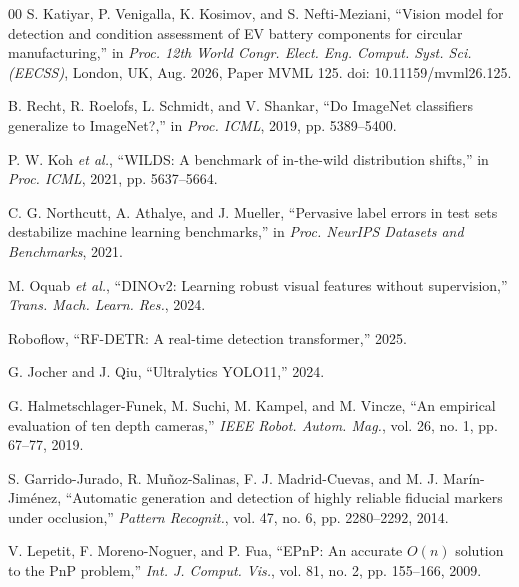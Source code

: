 \documentclass[conference]{IEEEtran}
\begin{document}
\begin{thebibliography}{00}
 S. Katiyar, P. Venigalla, K. Kosimov, and S. Nefti-Meziani,
``Vision model for detection and condition assessment of EV battery components for
circular manufacturing,'' in \emph{Proc. 12th World Congr. Elect. Eng. Comput. Syst. Sci. (EECSS)}, London, UK, Aug. 2026,
Paper MVML 125. doi: 10.11159/mvml26.125.

 B. Recht, R. Roelofs, L. Schmidt, and V. Shankar, ``Do ImageNet
classifiers generalize to ImageNet?,'' in \emph{Proc. ICML}, 2019, pp. 5389--5400.

 P. W. Koh \emph{et al.}, ``WILDS: A benchmark of in-the-wild
distribution shifts,'' in \emph{Proc. ICML}, 2021, pp. 5637--5664.

 C. G. Northcutt, A. Athalye, and J. Mueller, ``Pervasive
label errors in test sets destabilize machine learning benchmarks,'' in \emph{Proc.
NeurIPS Datasets and Benchmarks}, 2021.

 M. Oquab \emph{et al.}, ``DINOv2: Learning robust visual features
without supervision,'' \emph{Trans. Mach. Learn. Res.}, 2024.

 Roboflow, ``RF-DETR: A real-time detection transformer,'' 2025.

 G. Jocher and J. Qiu, ``Ultralytics YOLO11,'' 2024.

 G. Halmetschlager-Funek, M. Suchi, M. Kampel, and
M. Vincze, ``An empirical evaluation of ten depth cameras,'' \emph{IEEE Robot. Autom. Mag.}, vol. 26, no. 1, pp. 67--77, 2019.

 S. Garrido-Jurado, R. Mu\~{n}oz-Salinas, F. J. Madrid-Cuevas, and
M. J. Mar\'{i}n-Jim\'{e}nez, ``Automatic generation and detection of highly reliable
fiducial markers under occlusion,'' \emph{Pattern Recognit.}, vol. 47, no. 6,
pp. 2280--2292, 2014.

 V. Lepetit, F. Moreno-Noguer, and P. Fua, ``EPnP: An
accurate $O(n)$ solution to the PnP problem,'' \emph{Int. J. Comput. Vis.}, vol. 81, no. 2, pp. 155--166, 2009.

\end{thebibliography}
\end{document}
